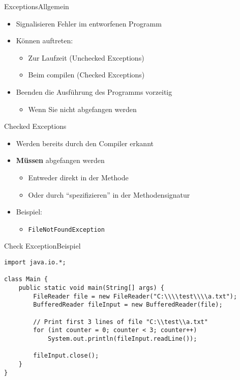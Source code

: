 \begin{frame}{Exceptions}{Allgemein}
    \begin{itemize}[<+->]
        \item Signalisieren Fehler im entworfenen Programm
        \item Können auftreten:
        \begin{itemize}
            \item Zur Laufzeit (Unchecked Exceptions)
            \item Beim compilen (Checked Exceptions)
        \end{itemize}
        \item Beenden die Ausführung des Programms vorzeitig
        \begin{itemize}
            \item Wenn Sie nicht abgefangen werden
        \end{itemize}
    \end{itemize}
\end{frame}

\begin{frame}{Checked Exceptions}{}
    \begin{itemize}[<+->]
        \item Werden bereits durch den Compiler erkannt
        \item \textbf{Müssen} abgefangen werden
        \begin{itemize}
            \item Entweder direkt in der Methode
            \item Oder durch "`spezifizieren"' in der Methodensignatur
        \end{itemize}
        \item Beispiel:
        \begin{itemize}
            \item \texttt{FileNotFoundException}
        \end{itemize}
    \end{itemize}
\end{frame}

\begin{frame}[fragile]{Check Exception}{Beispiel}
\lstset{style=java}
\begin{lstlisting}
import java.io.*; 
  
class Main { 
    public static void main(String[] args) { 
        FileReader file = new FileReader("C:\\\\test\\\\a.txt"); 
        BufferedReader fileInput = new BufferedReader(file); 
          
        // Print first 3 lines of file "C:\\test\\a.txt" 
        for (int counter = 0; counter < 3; counter++)  
            System.out.println(fileInput.readLine()); 
          
        fileInput.close(); 
    } 
}
\end{lstlisting}
\end{frame}

